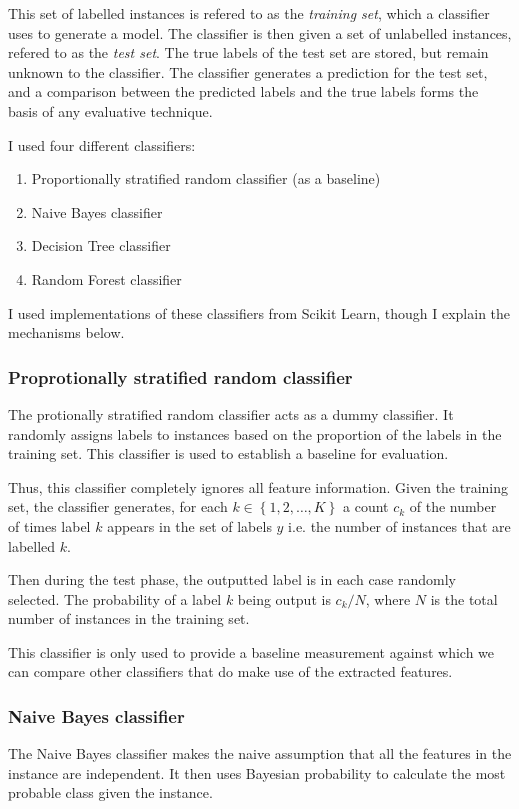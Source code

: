       This set of labelled instances is refered to as the \emph{training set}, which a classifier uses to generate a model. The classifier is then given a set of unlabelled instances, refered to as the \emph{test set}. The true labels of the test set are stored, but remain unknown to the classifier. The classifier generates a prediction for the test set, and a comparison between the predicted labels and the true labels forms the basis of any evaluative technique.
      
      I used four different classifiers:
      \begin{enumerate}
        \item Proportionally stratified random classifier (as a baseline)
        \item Naive Bayes classifier
        \item Decision Tree classifier
        \item Random Forest classifier
      \end{enumerate}
      
      I used implementations of these classifiers from Scikit Learn, though I explain the mechanisms below.
      
      \subsubsection{Proprotionally stratified random classifier}
        The protionally stratified random classifier acts as a dummy classifier. It randomly assigns labels to instances based on the proportion of the labels in the training set. This classifier is used to establish a baseline for evaluation.
        
        Thus, this classifier completely ignores all feature information. Given the training set, the classifier generates, for each $k \in \left\{1, 2, \dots, K\right\}$  a count $c_k$ of the number of times label $k$ appears in the set of labels $y$ i.e. the number of instances that are labelled $k$.
        
        Then during the test phase, the outputted label is in each case randomly selected. The probability of a label $k$ being output is $c_k / N$, where $N$ is the total number of instances in the training set.
        
        This classifier is only used to provide a baseline measurement against which we can compare other classifiers that do make use of the extracted features.
        
      \subsubsection{Naive Bayes classifier}
        The Naive Bayes classifier makes the naive assumption that all the features in the instance are independent. It then uses Bayesian probability to calculate the most probable class given the instance. 
        
